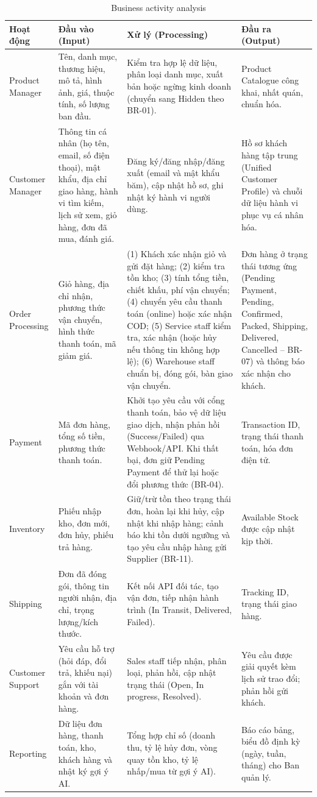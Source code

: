 \documentclass[12pt,a4paper,oneside]{report}
\begin{document}
\begin{longtable}{p{2.3cm}p{3.9cm}p{5.6cm}p{4.0cm}}
\caption{Business activity analysis}\\
\toprule
\textbf{Hoạt động} & \textbf{Đầu vào (Input)} & \textbf{Xử lý (Processing)} & \textbf{Đầu ra (Output)} \\
\midrule
\endhead
\bottomrule
\endlastfoot
Product Manager & Tên, danh mục, thương hiệu, mô tả, hình ảnh, giá, thuộc tính, số lượng ban đầu. & Kiểm tra hợp lệ dữ liệu, phân loại danh mục, xuất bản hoặc ngừng kinh doanh (chuyển sang Hidden theo BR-01). & Product Catalogue công khai, nhất quán, chuẩn hóa. \\
Customer Manager & Thông tin cá nhân (họ tên, email, số điện thoại), mật khẩu, địa chỉ giao hàng, hành vi tìm kiếm, lịch sử xem, giỏ hàng, đơn đã mua, đánh giá. & Đăng ký/đăng nhập/đăng xuất (email và mật khẩu băm), cập nhật hồ sơ, ghi nhật ký hành vi người dùng. & Hồ sơ khách hàng tập trung (Unified Customer Profile) và chuỗi dữ liệu hành vi phục vụ cá nhân hóa. \\
Order Processing & Giỏ hàng, địa chỉ nhận, phương thức vận chuyển, hình thức thanh toán, mã giảm giá. & (1) Khách xác nhận giỏ và gửi đặt hàng; (2) kiểm tra tồn kho; (3) tính tổng tiền, chiết khấu, phí vận chuyển; (4) chuyển yêu cầu thanh toán (online) hoặc xác nhận COD; (5) Service staff kiểm tra, xác nhận (hoặc hủy nếu thông tin không hợp lệ); (6) Warehouse staff chuẩn bị, đóng gói, bàn giao vận chuyển. & Đơn hàng ở trạng thái tương ứng (Pending Payment, Pending, Confirmed, Packed, Shipping, Delivered, Cancelled -- BR-07) và thông báo xác nhận cho khách. \\
Payment & Mã đơn hàng, tổng số tiền, phương thức thanh toán. & Khởi tạo yêu cầu với cổng thanh toán, bảo vệ dữ liệu giao dịch, nhận phản hồi (Success/Failed) qua Webhook/API. Khi thất bại, đơn giữ Pending Payment để thử lại hoặc đổi phương thức (BR-04). & Transaction ID, trạng thái thanh toán, hóa đơn điện tử. \\
Inventory & Phiếu nhập kho, đơn mới, đơn hủy, phiếu trả hàng. & Giữ/trừ tồn theo trạng thái đơn, hoàn lại khi hủy, cập nhật khi nhập hàng; cảnh báo khi tồn dưới ngưỡng và tạo yêu cầu nhập hàng gửi Supplier (BR-11). & Available Stock được cập nhật kịp thời. \\
Shipping & Đơn đã đóng gói, thông tin người nhận, địa chỉ, trọng lượng/kích thước. & Kết nối API đối tác, tạo vận đơn, tiếp nhận hành trình (In Transit, Delivered, Failed). & Tracking ID, trạng thái giao hàng. \\
Customer Support & Yêu cầu hỗ trợ (hỏi đáp, đổi trả, khiếu nại) gắn với tài khoản và đơn hàng. & Sales staff tiếp nhận, phân loại, phản hồi, cập nhật trạng thái (Open, In progress, Resolved). & Yêu cầu được giải quyết kèm lịch sử trao đổi; phản hồi gửi khách. \\
Reporting & Dữ liệu đơn hàng, thanh toán, kho, khách hàng và nhật ký gợi ý AI. & Tổng hợp chỉ số (doanh thu, tỷ lệ hủy đơn, vòng quay tồn kho, tỷ lệ nhấp/mua từ gợi ý AI). & Báo cáo bảng, biểu đồ định kỳ (ngày, tuần, tháng) cho Ban quản lý. \\
\end{longtable}
\end{document}
